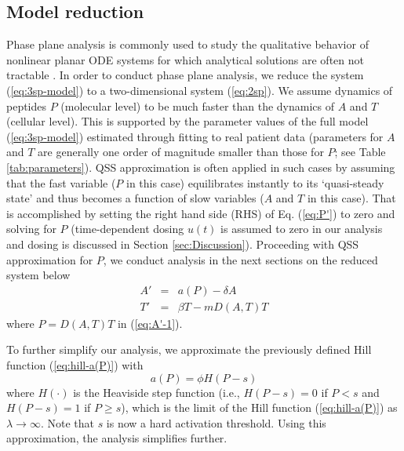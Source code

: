 \documentclass[review,authoryear]{elsarticle}
\begin{document}
\subsection{Model reduction}
Phase plane analysis is commonly used to study the qualitative behavior of nonlinear planar ODE systems for which analytical solutions are often not tractable \citep[see, e.g.,][Chapter 2]{jordan2007nonlinear}. In order to conduct phase plane analysis, we reduce the system (\ref{eq:3sp-model}) to a two-dimensional system (\ref{eq:2sp}). We assume dynamics of peptides $P$ (molecular level) to be much faster than the dynamics of $A$ and $T$ (cellular level).
This is supported by the parameter values of the full model (\ref{eq:3sp-model}) estimated through fitting to real
patient data (parameters for $A$ and $T$ are generally one order of magnitude smaller than those for $P$; see Table \ref{tab:parameters}). QSS approximation is often applied in such cases by assuming that the fast variable ($P$ in this case) equilibrates instantly to its `quasi-steady state' and thus becomes a function of slow variables ($A$ and $T$ in this case). That is accomplished by setting the right hand side (RHS) of Eq. (\ref{eq:P'}) to zero and solving for $P$ (time-dependent dosing $u(t)$ is assumed to zero in our analysis and dosing is discussed in Section \ref{sec:Discussion}). Proceeding with QSS
approximation for $P$, we conduct analysis in the next sections on
the reduced system below
\begin{subequations} \label{eq:2sp}
\begin{eqnarray}
A' & = & a(P)-\delta A \label{eq:A'-1}\\
T' & = & \beta T-mD(A,T)T \label{eq:T'-1}
\end{eqnarray}
\end{subequations}
where $P=D(A,T)T$ in (\ref{eq:A'-1}).

To further simplify our analysis, we approximate the previously defined Hill function (\ref{eq:hill-a(P)}) with 
\begin{equation} \label{eq:heaviside}
a(P)=\phi H(P-s)
\end{equation}
where $H(\cdot)$ is the Heaviside step function (i.e., $H(P-s)=0$ if $P<s$
and $H(P-s)=1$ if $P \ge s$), which is the limit of the Hill
function (\ref{eq:hill-a(P)}) as $\lambda\to\infty$. Note that $s$ is now a hard activation threshold. Using this approximation, the analysis simplifies further. 
\end{document}
